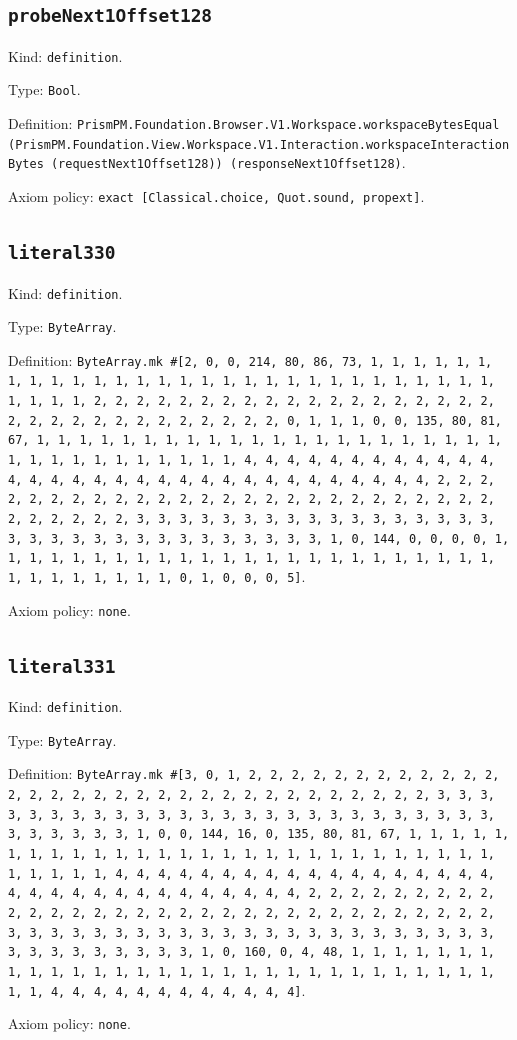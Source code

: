 \documentclass[11pt]{article}
\begin{document}
\subsection*{\texttt{probeNext1Offset128}}
\noindent Kind: \texttt{definition}.\par
\noindent Type: \texttt{Bool}.\par
\noindent Definition: \texttt{PrismPM.Foundation.Browser.V1.Workspace.workspaceBytesEqual (PrismPM.Foundation.View.Workspace.V1.Interaction.workspaceInteractionBytes (requestNext1Offset128)) (responseNext1Offset128)}.\par
\noindent Axiom policy: \texttt{exact [Classical.choice, Quot.sound, propext]}.\par
\subsection*{\texttt{literal330}}
\noindent Kind: \texttt{definition}.\par
\noindent Type: \texttt{ByteArray}.\par
\noindent Definition: \texttt{ByteArray.mk \#[2, 0, 0, 214, 80, 86, 73, 1, 1, 1, 1, 1, 1, 1, 1, 1, 1, 1, 1, 1, 1, 1, 1, 1, 1, 1, 1, 1, 1, 1, 1, 1, 1, 1, 1, 1, 1, 1, 1, 1, 2, 2, 2, 2, 2, 2, 2, 2, 2, 2, 2, 2, 2, 2, 2, 2, 2, 2, 2, 2, 2, 2, 2, 2, 2, 2, 2, 2, 2, 2, 2, 2, 0, 1, 1, 1, 0, 0, 135, 80, 81, 67, 1, 1, 1, 1, 1, 1, 1, 1, 1, 1, 1, 1, 1, 1, 1, 1, 1, 1, 1, 1, 1, 1, 1, 1, 1, 1, 1, 1, 1, 1, 1, 1, 1, 4, 4, 4, 4, 4, 4, 4, 4, 4, 4, 4, 4, 4, 4, 4, 4, 4, 4, 4, 4, 4, 4, 4, 4, 4, 4, 4, 4, 4, 4, 4, 4, 2, 2, 2, 2, 2, 2, 2, 2, 2, 2, 2, 2, 2, 2, 2, 2, 2, 2, 2, 2, 2, 2, 2, 2, 2, 2, 2, 2, 2, 2, 2, 2, 3, 3, 3, 3, 3, 3, 3, 3, 3, 3, 3, 3, 3, 3, 3, 3, 3, 3, 3, 3, 3, 3, 3, 3, 3, 3, 3, 3, 3, 3, 3, 3, 1, 0, 144, 0, 0, 0, 0, 1, 1, 1, 1, 1, 1, 1, 1, 1, 1, 1, 1, 1, 1, 1, 1, 1, 1, 1, 1, 1, 1, 1, 1, 1, 1, 1, 1, 1, 1, 1, 1, 0, 1, 0, 0, 0, 5]}.\par
\noindent Axiom policy: \texttt{none}.\par
\subsection*{\texttt{literal331}}
\noindent Kind: \texttt{definition}.\par
\noindent Type: \texttt{ByteArray}.\par
\noindent Definition: \texttt{ByteArray.mk \#[3, 0, 1, 2, 2, 2, 2, 2, 2, 2, 2, 2, 2, 2, 2, 2, 2, 2, 2, 2, 2, 2, 2, 2, 2, 2, 2, 2, 2, 2, 2, 2, 2, 2, 2, 3, 3, 3, 3, 3, 3, 3, 3, 3, 3, 3, 3, 3, 3, 3, 3, 3, 3, 3, 3, 3, 3, 3, 3, 3, 3, 3, 3, 3, 3, 3, 3, 1, 0, 0, 144, 16, 0, 135, 80, 81, 67, 1, 1, 1, 1, 1, 1, 1, 1, 1, 1, 1, 1, 1, 1, 1, 1, 1, 1, 1, 1, 1, 1, 1, 1, 1, 1, 1, 1, 1, 1, 1, 1, 1, 4, 4, 4, 4, 4, 4, 4, 4, 4, 4, 4, 4, 4, 4, 4, 4, 4, 4, 4, 4, 4, 4, 4, 4, 4, 4, 4, 4, 4, 4, 4, 4, 2, 2, 2, 2, 2, 2, 2, 2, 2, 2, 2, 2, 2, 2, 2, 2, 2, 2, 2, 2, 2, 2, 2, 2, 2, 2, 2, 2, 2, 2, 2, 2, 3, 3, 3, 3, 3, 3, 3, 3, 3, 3, 3, 3, 3, 3, 3, 3, 3, 3, 3, 3, 3, 3, 3, 3, 3, 3, 3, 3, 3, 3, 3, 3, 1, 0, 160, 0, 4, 48, 1, 1, 1, 1, 1, 1, 1, 1, 1, 1, 1, 1, 1, 1, 1, 1, 1, 1, 1, 1, 1, 1, 1, 1, 1, 1, 1, 1, 1, 1, 1, 1, 4, 4, 4, 4, 4, 4, 4, 4, 4, 4, 4, 4]}.\par
\noindent Axiom policy: \texttt{none}.\par
\end{document}
